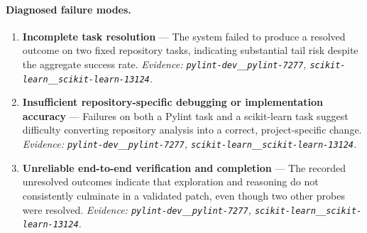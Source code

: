 \paragraph{Diagnosed failure modes.}\begin{enumerate}\itemsep1pt
\item \textbf{Incomplete task resolution} --- The system failed to produce a resolved outcome on two fixed repository tasks, indicating substantial tail risk despite the aggregate success rate. \emph{Evidence: \texttt{pylint-dev\_\_pylint-7277}, \texttt{scikit-learn\_\_scikit-learn-13124}.}
\item \textbf{Insufficient repository-specific debugging or implementation accuracy} --- Failures on both a Pylint task and a scikit-learn task suggest difficulty converting repository analysis into a correct, project-specific change. \emph{Evidence: \texttt{pylint-dev\_\_pylint-7277}, \texttt{scikit-learn\_\_scikit-learn-13124}.}
\item \textbf{Unreliable end-to-end verification and completion} --- The recorded unresolved outcomes indicate that exploration and reasoning do not consistently culminate in a validated patch, even though two other probes were resolved. \emph{Evidence: \texttt{pylint-dev\_\_pylint-7277}, \texttt{scikit-learn\_\_scikit-learn-13124}.}
\end{enumerate}

